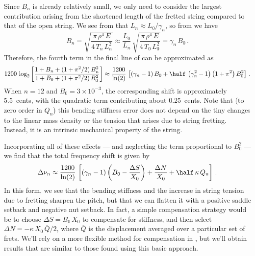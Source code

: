 Since $B_n$ is already relatively small, we only need to consider the largest contribution arising from the shortened length of the fretted string compared to that of the open string. We see from  that $L_n \approx L_0/\gamma_n$, so from  we have
 \begin{equation} \label{eqn:bg_n_def}
B_n = \sqrt{\frac{\pi\, \rho^4\, E}{4\, T_n\, L_n^2}} \approx \frac{L_0}{L_n}\, \sqrt{\frac{\pi\, \rho^4\, E}{4\, T_0\, L_0^2}} = \gamma_n\, B_0\, .
 \end{equation}
Therefore, the fourth term in the final line of  can be approximated as
 \begin{equation}
1200\, \log_2 \left[ \frac{1 + B_n + (1 + \pi^2/2)\, B_n^2}{1 + B_0 + (1 + \pi^2/2)\, B_0^2} \right] \approx \frac{1200}{\ln(2)}\, \left[ \left(\gamma_n - 1\right) B_0 + \half\, \left(\gamma_n^2 - 1\right) \left(1 + \pi^2\right) B_0^2 \right]\, .
 \end{equation}
When $n = 12$ and $B_0 = 3 \times 10^{-3}$, the corresponding shift is approximately 5.5~cents, with the quadratic term contributing about 0.25~cents. Note that (to zero order in $Q_n$) this bending stiffness error does not depend on the tiny changes to the linear mass density or the tension that arises due to string fretting. Instead, it is an intrinsic mechanical property of the string.\bigskip

Incorporating all of these effects --- and neglecting the term proportional to $B_0^2$ --- we find that the total frequency shift is given by
 \begin{equation}\label{eqn:error_tot}
\Delta \nu_n \approx \frac{1200}{\ln(2)}\, \left[ \left(\gamma_n - 1\right) \left(B_0 - \frac{\Delta S}{X_0}\right) + \frac{\Delta N}{X_0} + \half\, \kappa\, Q_n \right]\, .
 \end{equation}
In this form, we see that the bending stiffness and the increase in string tension due to fretting sharpen the pitch, but that we can flatten it with a positive saddle setback and negative nut setback. In fact, a simple compensation strategy would be to choose $\Delta S = B_0\, X_0$ to compensate for stiffness, and then select $\Delta N = - \kappa\, X_0\, \overline{Q} / 2$, where $\overline{Q}$ is the displacement averaged over a particular set of frets. We'll rely on a more flexible method for compensation in , but we'll obtain results that are similar to those found using this basic approach. 